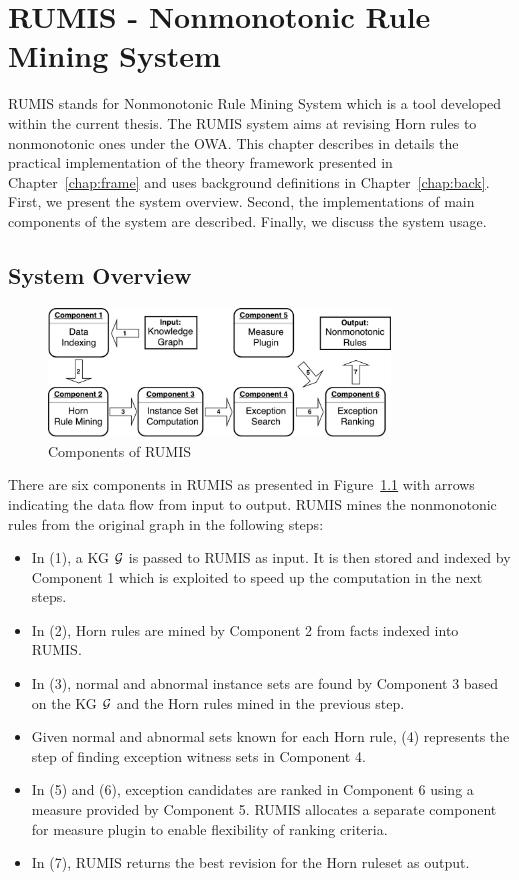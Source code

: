 \chapter{RUMIS - Nonmonotonic Rule Mining System}\label{chap:system}
\label{chap:system}

RUMIS stands for Nonmonotonic Rule Mining System which is a tool developed within the current thesis. The RUMIS system aims at revising Horn rules to nonmonotonic ones under the OWA. This chapter describes in details the practical implementation of the theory framework presented in Chapter~\ref{chap:frame} and uses background definitions in Chapter~\ref{chap:back}. First, we present the system overview. Second, the implementations of main components of the system are described. Finally, we discuss the system usage.

\section{System Overview}
\label{sec:overview}

\begin{figure}[h]
\centering
\includegraphics[width=0.81\textwidth]{figures/system_overview}
\caption{Components of RUMIS}
\label{system_overview}
\end{figure}

There are six components in RUMIS as presented in Figure~\ref{system_overview} with arrows indicating the data flow from input to output. RUMIS mines the nonmonotonic rules from the original graph in the following steps:

\begin{itemize}
\item In (1), a KG $\mathcal{G}$ is passed to RUMIS as input. It is then stored and indexed by Component 1 which is exploited to speed up the computation in the next steps.
\item In (2), Horn rules are mined by Component 2 from facts indexed into RUMIS.
\item In (3), normal and abnormal instance sets are found by Component 3 based on the KG $\mathcal{G}$ and the Horn rules mined in the previous step.
\item Given normal and abnormal sets known for each Horn rule, (4) represents the step of finding exception witness sets in Component 4.
\item In (5) and (6), exception candidates are ranked in Component 6 using a measure provided by Component 5. RUMIS allocates a separate component for measure plugin to enable flexibility of ranking criteria.
\item In (7), RUMIS returns the best revision for the Horn ruleset as output.
\end{itemize}

